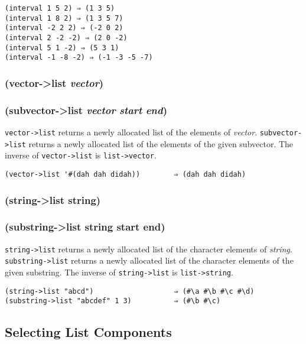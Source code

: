 \documentclass{article}
\begin{document}
\begin{verbatim}
(interval 1 5 2) ⇒ (1 3 5)
(interval 1 8 2) ⇒ (1 3 5 7)
(interval -2 2 2) ⇒ (-2 0 2)
(interval 2 -2 -2) ⇒ (2 0 -2)
(interval 5 1 -2) ⇒ (5 3 1)
(interval -1 -8 -2) ⇒ (-1 -3 -5 -7)
\end{verbatim}

\subsubsection{(vector-\textgreater{}list \emph{vector})}

\subsubsection{(subvector-\textgreater{}list \emph{vector} \emph{start} \emph{end})}

\verb|vector->list| returns a newly allocated list of the elements of \emph{vector}.
\verb|subvector->list| returns a newly allocated list of the elements of the given subvector.
The inverse of \verb|vector->list| is \verb|list->vector|.

\begin{verbatim}
(vector->list '#(dah dah didah))        ⇒ (dah dah didah)
\end{verbatim}

\subsubsection{(string-\textgreater{}list string)}

\subsubsection{(substring-\textgreater{}list string start end)}

\verb|string->list| returns a newly allocated list of the character elements of
\emph{string}. \verb|substring->list| returns a newly allocated list of the
character elements of the given substring. The inverse of \verb|string->list|
is \verb|list->string|.

\begin{verbatim}
(string->list "abcd")                   ⇒ (#\a #\b #\c #\d)
(substring->list "abcdef" 1 3)          ⇒ (#\b #\c)
\end{verbatim}

\subsection{Selecting List Components}\label{sec:selecting-list-components}
\end{document}
